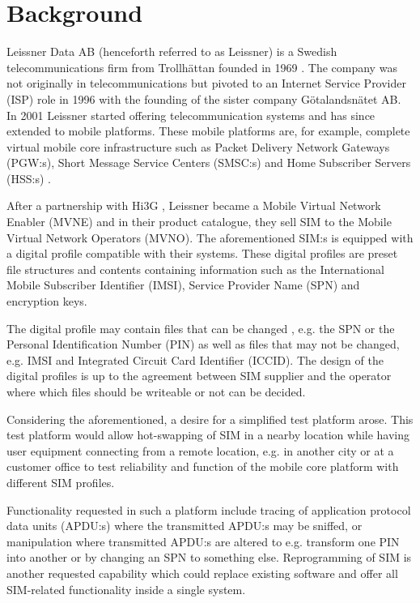 \section{Background}

Leissner Data AB (henceforth referred to as Leissner) is a Swedish
telecommunications firm from Trollhättan founded in 1969
\cite{leissner-about}. The company was not originally in
telecommunications but pivoted to an Internet Service Provider
(ISP) role in 1996 with the founding of the sister company
Götalandsnätet AB. In 2001 Leissner started offering
telecommunication systems and has since extended to mobile
platforms. These mobile platforms are, for example, complete
virtual mobile core infrastructure such as Packet Delivery Network
Gateways (PGW:s), Short Message Service Centers (SMSC:s) and Home
Subscriber Servers (HSS:s) \cite{leissner-mobile-core}.

After a partnership with Hi3G \cite{leissner-about}, Leissner
became a Mobile Virtual Network Enabler (MVNE) and in their product
catalogue, they sell SIM to the Mobile Virtual Network Operators
(MVNO). The aforementioned SIM:s is equipped with a digital profile
compatible with their systems. These digital profiles are preset
file structures and contents containing information such as the
International Mobile Subscriber Identifier (IMSI), Service Provider
Name (SPN) and encryption keys.

The digital profile may contain files that can be changed
\cite{placeholder-source-for-smart-card-profiles}, e.g. the SPN or
the Personal Identification Number (PIN) as well as files that may
not be changed, e.g. IMSI and Integrated Circuit Card Identifier
(ICCID). The design of the digital profiles is up to the agreement
between SIM supplier and the operator where which files should be
writeable or not can be decided.

Considering the aforementioned, a desire for a simplified test
platform arose. This test platform would allow hot-swapping of SIM
in a nearby location while having user equipment connecting from a
remote location, e.g. in another city or at a customer office to
test reliability and function of the mobile core platform with
different SIM profiles.

Functionality requested in such a platform include tracing of
application protocol data units (APDU:s) where the transmitted
APDU:s may be sniffed, or manipulation where transmitted APDU:s are
altered to e.g. transform one PIN into another or by changing an
SPN to something else. Reprogramming of SIM is another requested
capability which could replace existing software and offer all
SIM-related functionality inside a single system.

